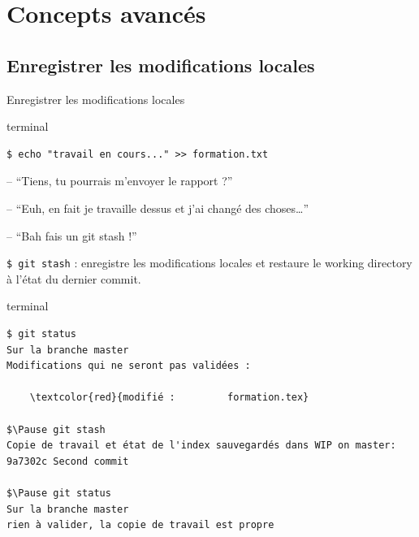 \documentclass[usepdftitle=false]{beamer}
\def\seplength{.3\topsep}
\newcommand{\Pause}{%
\ifdef{\Release}
  {\pause}
  {}
}
\begin{document}
\section{Concepts avancés}

\subsection{Enregistrer les modifications locales}

\begin{frame}[fragile]{Enregistrer les modifications locales}

	\begin{beamercolorbox}[rounded=true,shadow=true]{terminal}
\vspace{-\seplength}
\begin{Verbatim}
$ echo "travail en cours..." >> formation.txt
\end{Verbatim}
	\end{beamercolorbox}

	\Pause

	\begin{block}{}
		-- \enquote{Tiens, tu pourrais m'envoyer le rapport ?} \\
		\Pause
		-- \enquote{Euh, en fait je travaille dessus et j'ai changé des choses\ldots} \\
		\Pause
		-- \enquote{Bah fais un git stash !}
	\end{block}

	\verb+$ git stash+ : enregistre les modifications locales et restaure le working directory à l'état du dernier commit.

	\Pause

	\begin{beamercolorbox}[rounded=true,shadow=true]{terminal}
\vspace{-\seplength}
	\begin{Verbatim}
$ git status
Sur la branche master
Modifications qui ne seront pas validées :

	\textcolor{red}{modifié :         formation.tex}

$\Pause git stash
Copie de travail et état de l'index sauvegardés dans WIP on master: 9a7302c Second commit

$\Pause git status
Sur la branche master
rien à valider, la copie de travail est propre
\end{Verbatim}
	\end{beamercolorbox}
\end{frame}
\end{document}
